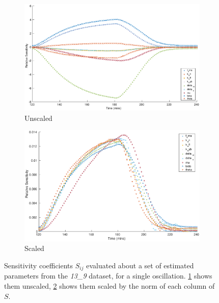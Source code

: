 \documentclass[10pt,journal]{./IEEE_latex_class/IEEEtran}
\begin{document}
\begin{figure}[h]	
	\begin{subfigure}[h]{0.49\textwidth}
    \centering
        \includegraphics[scale = 0.23,clip = true, trim = 110 0 60 0]{Sensitivity_unscaled}
        \caption{Unscaled}
        \label{SensitivityMatrix_unscaled} 
    \end{subfigure}
    \begin{subfigure}[h]{0.49\textwidth}
    \centering
        \includegraphics[scale = 0.23,clip = true, trim = 70 0 60 0]{Sensitivity_scaled}
        \caption{Scaled}
                \label{SensitivityMatrix_scaled} 
    \end{subfigure}
    \caption{Sensitivity coefficients $S_{ij}$ evaluated about a set of estimated parameters from the \textit{13\_9} dataset, for a single oscillation. \ref{SensitivityMatrix_unscaled} shows them unscaled, \ref{SensitivityMatrix_scaled} shows them scaled by the norm of each column of $S$.} 
\label{SensitivityMatrix}   
\end{figure}
\end{document}

